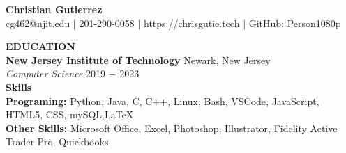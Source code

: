 \documentclass{article}
\begin{document}
\begin{center}
\thispagestyle{empty}
\large \textbf{Christian Gutierrez \\}
\normalsize cg462@njit.edu $\mid$ 201-290-0058 $\mid$ https://chrisgutie.tech
 $\mid$ GitHub: Person1080p    \\
\hrulefill
\end{center}





\noindent \textbf{\underline{EDUCATION}} \\
\textbf{New Jersey Institute of Technology} \hfill Newark, New Jersey \\
\textit{Computer Science}  \hfill \hfill 2019 $-$ 2023 \\



\noindent \textbf{\underline{Skills}} \\
\noindent \textbf{Programing: } Python, Java, C, C++, Linux, Bash, VSCode, JavaScript, HTML5, 
CSS, mySQL,\LaTeX \\
\noindent \textbf{Other Skills: } Microsoft Office, Excel, Photoshop, Illustrator, Fidelity Active Trader Pro, Quickbooks\\
\end{document}
